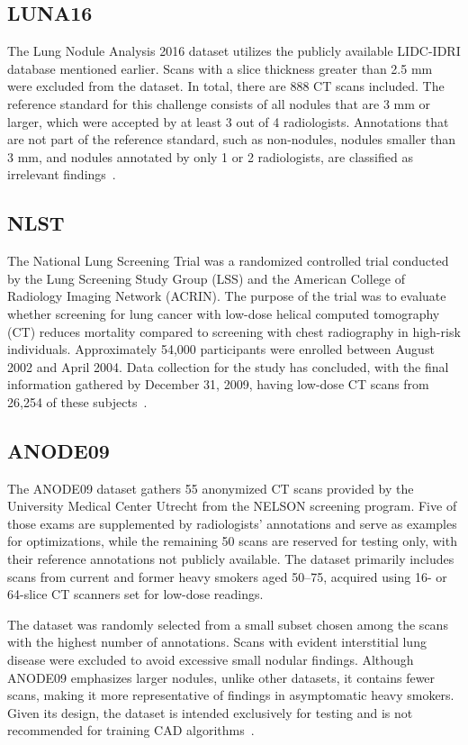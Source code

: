 \subsection{LUNA16}\label{luna16}
The Lung Nodule Analysis 2016 dataset utilizes the publicly available LIDC-IDRI database mentioned earlier. Scans with a slice thickness greater than 2.5 mm were excluded from the dataset. In total, there are 888 CT scans included. The reference standard for this challenge consists of all nodules that are 3 mm or larger, which were accepted by at least 3 out of 4 radiologists. Annotations that are not part of the reference standard, such as non-nodules, nodules smaller than 3 mm, and nodules annotated by only 1 or 2 radiologists, are classified as irrelevant findings~\cite{LUNA16}.

\subsection{NLST}\label{nlst}
The National Lung Screening Trial was a randomized controlled trial conducted by the Lung Screening Study Group (LSS) and the American College of Radiology Imaging Network (ACRIN). The purpose of the trial was to evaluate whether screening for lung cancer with low-dose helical computed tomography (CT) reduces mortality compared to screening with chest radiography in high-risk individuals. 
Approximately 54,000 participants were enrolled between August 2002 and April 2004. Data collection for the study has concluded, with the final information gathered by December 31, 2009, having low-dose CT scans from 26,254 of these subjects~\cite{NLST2013, NLST}.

\subsection{ANODE09}\label{anode09}
The ANODE09 dataset gathers 55 anonymized CT scans provided by the University Medical Center Utrecht from the NELSON screening program. Five of those exams are supplemented by radiologists' annotations and serve as examples for optimizations, while the remaining 50 scans are reserved for testing only, with their reference annotations not publicly available. The dataset primarily includes scans from current and former heavy smokers aged 50–75, acquired using 16- or 64-slice CT scanners set for low-dose readings.

The dataset was randomly selected from a small subset chosen among the scans with the highest number of annotations. Scans with evident interstitial lung disease were excluded to avoid excessive small nodular findings. Although ANODE09 emphasizes larger nodules, unlike other datasets, it contains fewer scans, making it more representative of findings in asymptomatic heavy smokers. Given its design, the dataset is intended exclusively for testing and is not recommended for training CAD algorithms~\cite{ANODE09}.

